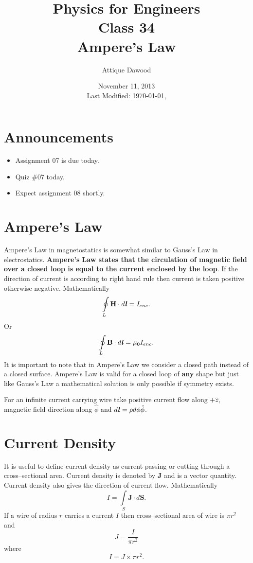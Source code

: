 \documentclass[12pt,a4paper]{article}
\title{\vspace{-3cm}Physics for Engineers\\Class 34\\Ampere's Law}
\author{Attique Dawood}
\date{November 11, 2013\\[0.2cm] Last Modified: \today, \currenttime}
\begin{document}
\maketitle
\section{Announcements}
\begin{itemize}
\item Assignment 07 is due today.
\item Quiz \#07 today.
\item Expect assignment 08 shortly.
\end{itemize}
\section{Ampere's Law}
Ampere's Law in magnetostatics is somewhat similar to Gauss's Law in electrostatics. \textbf{Ampere's Law states that the circulation of magnetic field over a closed loop is equal to the current enclosed by the loop}. If the direction of current is according to right hand rule then current is taken positive otherwise negative. Mathematically
\begin{equation}
\oint\limits_{L}\textbf{H}\cdot d\textbf{\textit{l}}=I_{enc}.
\end{equation}
Or
\begin{equation}
\oint\limits_{L}\textbf{B}\cdot d\textbf{\textit{l}}=\mu_0I_{enc}.
\end{equation}
It is important to note that in Ampere's Law we consider a closed path instead of a closed surface. Ampere's Law is valid for a closed loop of \textbf{any} shape but just like Gauss's Law a mathematical solution is only possible if symmetry exists.

For an infinite current carrying wire take positive current flow along $+\hat z$, magnetic field direction along $\hat \phi$ and $d\textbf{\textit{l}}=\rho d\phi\hat\phi$.
\section{Current Density}
It is useful to define current density as current passing or cutting through a cross--sectional area. Current density is denoted by \textbf{J} and is a vector quantity. Current density also gives the direction of current flow. Mathematically
\begin{equation}
I=\int\limits_{S}\textbf{J}\cdot d{\textbf{S}}.
\end{equation}
If a wire of radius $r$ carries a current $I$ then cross--sectional area of wire is $\pi r^2$ and
\begin{equation}
J=\dfrac{I}{\pi r^2}
\end{equation}
where
\begin{equation}
I=J\times\pi r^2.
\end{equation}
\newpage
\end{document}
